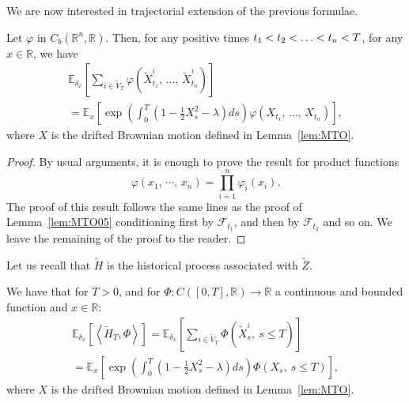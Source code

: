 \documentclass[AHL,Unicode,longabstracts,published]{cedram}
\newcommand{\Fo}{\mathcal{F}}
\newcommand*\R{\mathbb{R}}
\newcommand*\E{\mathbb{E}}
\begin{document}
We are now interested in trajectorial extension of the previous formulae.


\begin{prop}\label{lem:MTO06}
Let $\varphi$ in $C_{b}(\R^{n},\R)$. Then, for any positive times $t_{1}<t_{2}\linebreak<\ldots<t_{n}<T$, for any $x\in \R$, we have
\begin{multline}\label{eq:MTO06}
\E_{\delta_{x}}\left[\sum_{i \in \widetilde V_{T}} \varphi\left(\widetilde X^{i}_{t_{1}},\,\ldots,\, \widetilde X^{i}_{t_{n}}\right) \right]\\
=\E_{x}\left[\exp\left(\int_{0}^{T} \left(1-\frac{1}{2}X_{s}^{2}-\lambda \right)ds \right)\varphi\left(X_{t_{1}},\,\ldots,\,X_{t_{n}}\right) \right],
\end{multline}
where $X$ is the drifted Brownian motion defined in Lemma~\ref{lem:MTO}.
\end{prop}

\begin{proof}
By usual arguments, it is enough to prove the result for product functions
\[
\varphi\left(x_{1},\,\cdots,\, x_{n}\right)= \prod_{i=1}^n \varphi_{i}\left(x_{i}\right).
\]
The proof of this result follows the same lines as the proof of Lemma~\ref{lem:MTO05} conditioning first by $\Fo_{t_{1}}$, and then by $\Fo_{t_{2}}$ and so on. We leave the remaining of the proof to the reader.
\end{proof}



Let us recall that $\widetilde{H}$ is the historical process associated with $\widetilde{Z}$.
\begin{lemm}
We have that for $T>0$, and for $\Phi:C([0,T],\R)\to\R$ a continuous and bounded function and $x\in \R$:
\begin{multline}\label{eq:MTO099}
\E_{\delta_x}\left[\left\langle \widetilde{H}_T,\Phi\right\rangle\right]=\E_{\delta_{x}}\left[\sum_{i \in  \widetilde{V}_{T}}\Phi\left(\widetilde{X}^i_{s},\ s\leq T\right) \right]\\
=\E_{x}\left[\exp\left(\int_{0}^{T} \left(1-\frac{1}{2}X_{s}^{2}-\lambda \right)ds \right)\Phi\left(X_{s},\ s\leq T\right) \right],
\end{multline}
where $X$ is the drifted Brownian motion defined in Lemma~\ref{lem:MTO}.
\end{lemm}
\end{document}
